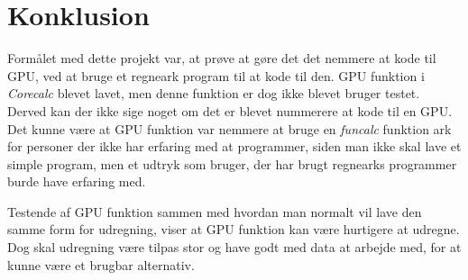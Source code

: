 \section{Konklusion}
Formålet med dette projekt var, at prøve at gøre det det nemmere at kode til GPU, ved at bruge et regneark program til at kode til den. GPU funktion i \textit{Corecalc} blevet lavet, men denne funktion er dog ikke blevet bruger testet. Derved kan der ikke sige noget om det er blevet nummerere at kode til en GPU. Det kunne være at GPU funktion var nemmere at bruge en \textit{funcalc} funktion ark for personer der ikke har erfaring med at programmer, siden man ikke skal lave et simple program, men et udtryk som bruger, der har brugt regnearks programmer burde have erfaring med.

Testende af GPU funktion sammen med hvordan man normalt vil lave den samme form for udregning, viser at GPU funktion kan være hurtigere at udregne. Dog skal udregning være tilpas stor og have godt med data at arbejde med, for at kunne være et brugbar alternativ.
